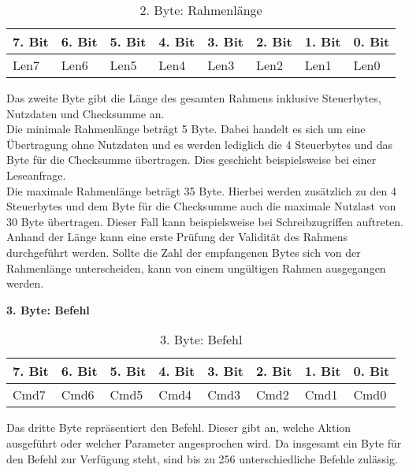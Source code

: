 \begin{table}[H]
\begin{center}
\begin{tabularx}{\textwidth}{|X|X|X|X|X|X|X|X|}\hline
 7. Bit & 6. Bit & 5. Bit & 4. Bit & 3. Bit & 2. Bit & 1. Bit & 0. Bit\\ \hline
 Len7 & Len6 & Len5 & Len4 & Len3 & Len2 & Len1 & Len0\\ \hline
\end{tabularx}
\caption{2. Byte: Rahmenlänge}
\label{table_2Byte}
\end{center}
\end{table}

Das zweite Byte gibt die Länge des gesamten Rahmens inklusive Steuerbytes, Nutzdaten und Checksumme an.\\ Die minimale Rahmenlänge beträgt 5 Byte. Dabei handelt es sich um eine Übertragung ohne Nutzdaten und es werden lediglich die 4 Steuerbytes und das Byte für die Checksumme übertragen. Dies geschieht beispielsweise bei einer Leseanfrage.\\
Die maximale Rahmenlänge beträgt 35 Byte. Hierbei werden zusätzlich zu den 4 Steuerbytes und dem Byte für die Checksumme auch die maximale Nutzlast von 30 Byte übertragen. Dieser Fall kann beispielsweise bei Schreibzugriffen auftreten.\\
Anhand der Länge kann eine erste Prüfung der Validität des Rahmens durchgeführt werden. Sollte die Zahl der empfangenen Bytes sich von der Rahmenlänge unterscheiden, kann von einem ungültigen Rahmen ausgegangen werden.


\textbf{3. Byte: Befehl}

\begin{table}[H]
\begin{center}
\begin{tabularx}{\textwidth}{|X|X|X|X|X|X|X|X|}\hline
 7. Bit & 6. Bit & 5. Bit & 4. Bit & 3. Bit & 2. Bit & 1. Bit & 0. Bit\\ \hline
 Cmd7 & Cmd6 & Cmd5 & Cmd4 & Cmd3 & Cmd2 & Cmd1 & Cmd0\\ \hline
\end{tabularx}
\caption{3. Byte: Befehl}
\label{table_3Byte}
\end{center}
\end{table}

Das dritte Byte repräsentiert den Befehl. Dieser gibt an, welche Aktion ausgeführt oder welcher Parameter angesprochen wird. Da insgesamt ein Byte für den Befehl zur Verfügung steht, sind bis zu 256 unterschiedliche Befehle zulässig.


